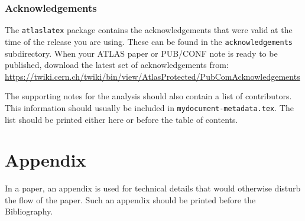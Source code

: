 \documentclass[UKenglish,texlive=2013]{\ATLASLATEXPATH atlasdoc}
\begin{document}
\section*{Acknowledgements}

%

The \texttt{atlaslatex} package contains the acknowledgements that were valid 
at the time of the release you are using.
These can be found in the \texttt{acknowledgements} subdirectory.
When your ATLAS paper or PUB/CONF note is ready to be published,
download the latest set of acknowledgements from:\\
\url{https://twiki.cern.ch/twiki/bin/view/AtlasProtected/PubComAcknowledgements}

The supporting notes for the analysis should also contain a list of contributors.
This information should usually be included in \texttt{mydocument-metadata.tex}.
The list should be printed either here or before the table of contents.


\clearpage
\appendix
\part*{Appendix}

In a paper, an appendix is used for technical details that would otherwise disturb the flow of the paper.
Such an appendix should be printed before the Bibliography.


\printbibliography
%
%

\clearpage
{}
\end{document}
